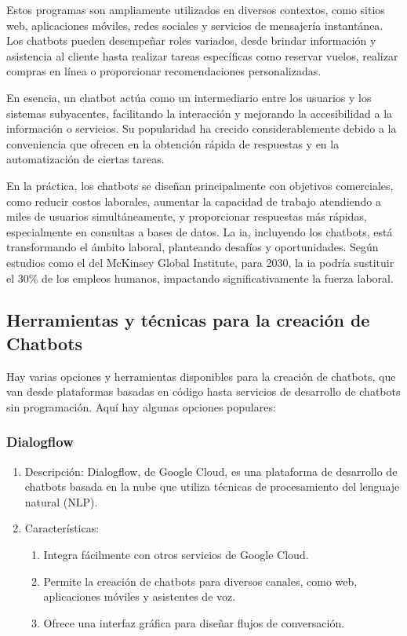 Estos programas son ampliamente utilizados en diversos contextos, como sitios web, aplicaciones móviles, redes sociales y servicios de mensajería instantánea. Los chatbots pueden desempeñar roles variados, desde brindar información y asistencia al cliente hasta realizar tareas específicas como reservar vuelos, realizar compras en línea o proporcionar recomendaciones personalizadas.

En esencia, un chatbot actúa como un intermediario entre los usuarios y los sistemas subyacentes, facilitando la interacción y mejorando la accesibilidad a la información o servicios. Su popularidad ha crecido considerablemente debido a la conveniencia que ofrecen en la obtención rápida de respuestas y en la automatización de ciertas tareas.

En la práctica, los chatbots se diseñan principalmente con objetivos comerciales, como reducir costos laborales, aumentar la capacidad de trabajo atendiendo a miles de usuarios simultáneamente, y proporcionar respuestas más rápidas, especialmente en consultas a bases de datos. La \acrlong{ia}, incluyendo los chatbots, está transformando el ámbito laboral, planteando desafíos y oportunidades. Según estudios como el del McKinsey Global Institute, para 2030, la \acrlong{ia} podría sustituir el 30\% de los empleos humanos, impactando significativamente la fuerza laboral.

\subsection{Herramientas y técnicas para la creación de Chatbots}

Hay varias opciones y herramientas disponibles para la creación de chatbots, que van desde plataformas basadas en código hasta servicios de desarrollo de chatbots sin programación. Aquí hay algunas opciones populares:

\subsubsection{Dialogflow}
\begin{enumerate}
\item Descripción: Dialogflow, de Google Cloud, es una plataforma de desarrollo de chatbots basada en la nube que utiliza técnicas de procesamiento del lenguaje natural (NLP).
\item Características:
\begin{enumerate}
\item Integra fácilmente con otros servicios de Google Cloud.
\item Permite la creación de chatbots para diversos canales, como web, aplicaciones móviles y asistentes de voz.
\item Ofrece una interfaz gráfica para diseñar flujos de conversación.
\end{enumerate}
\end{enumerate}

